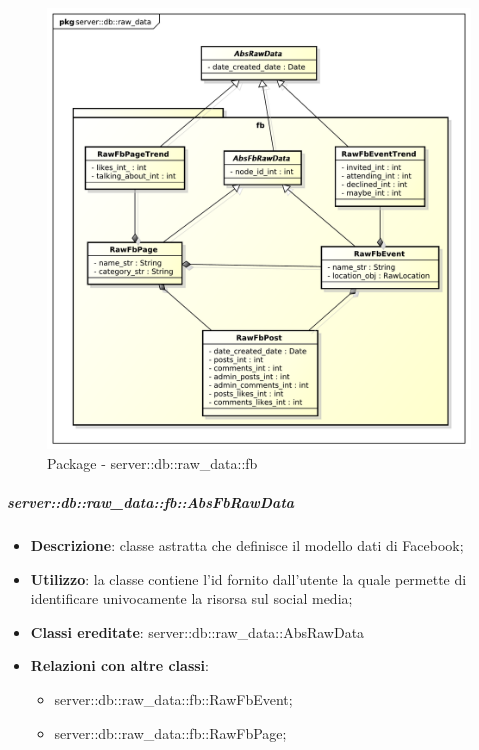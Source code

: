 

		\begin{figure}[htbp]
			\centering
			\centerline{\includegraphics[scale=0.5]{./images/server/raw_data_fb.pdf}}
			\caption{Package - server::db::raw\_data::fb}
		\end{figure}

		
		\subparagraph{server::db::raw\_data::fb::AbsFbRawData} %
		\label{subp:server_db_raw_data_fb_absfbrawdata}
			\begin{itemize}
				\item \textbf{Descrizione}: classe astratta che definisce il modello dati di Facebook;
				\item \textbf{Utilizzo}: la classe contiene l'id fornito dall'utente la quale permette di identificare univocamente la risorsa sul social media;
				\item \textbf{Classi ereditate}: server::db::raw\_data::AbsRawData
				\item \textbf{Relazioni con altre classi}:
					\begin{itemize}
						\item server::db::raw\_data::fb::RawFbEvent;
						\item server::db::raw\_data::fb::RawFbPage;
					\end{itemize}
			\end{itemize}


